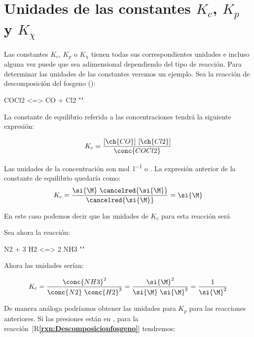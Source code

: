     \section{Unidades de las constantes \texorpdfstring{\(K_c\)}{Kc}, \texorpdfstring{\(K_p\)}{Kp} y  \texorpdfstring{\(K_{\chi}\)}{Kx}}

    Las constantes {\(K_c\)}, {\(K_p\)} o {\(K_{\chi}\)} tienen todas sus correspondientes unidades e incluso alguna vez puede que sea adimensional dependiendo del tipo de reacción.
    Para determinar las unidades de las constantes veremos un ejemplo.
    Sea la reacción de descomposición del fosgeno ():

    \begin{reaction}
        COCl2 \gas{} <=> CO \gas{} + Cl2 \gas{}
        "\label{rxn:Descomposicionfosgeno}"
    \end{reaction}

    La constante de equilibrio referida a las concentraciones tendrá la siguiente expresión:

    \begin{equation*}
        K_c = \dfrac{[\ch{CO}]\ [\ch{Cl2}]}{\conc{COCl2}}
    \end{equation*}

    Las unidades de la concentración son \si{\mole\per\litre} o \si{\M}.
    La expresión anterior de la constante de equilibrio quedaría como:
    \begin{equation*}
        K_c = \dfrac{\si{\M}\ \cancelred{\si{\M}}}{\cancelred{\si{\M}}} = \si{\M}
    \end{equation*}

    En este caso podemos decir que las unidades de \( K_c \) para esta reacción será \si{\M}

    Sea ahora la reacción:

    \begin{reaction}
        N2 \gas{} + 3 H2 \gas{} <=> 2 NH3 \gas{}
        "\label{rxn:descomposicionamoniaco}"
    \end{reaction}

    Ahora las unidades serían:

    \begin{equation*}
        K_c = \dfrac{\conc{NH3}^2}{\conc{N2}\ \conc{H2}^3} = \dfrac{\si{\M}^2}{\si{\M}\ \si{\M}^3 } = \dfrac{1}{\si{\M}^2}
    \end{equation*}

    De manera análoga podríamos obtener las unidades para \( K_p \) para las reacciones anteriores.
    Si las presiones están en \si{\atmosphere}, para la reacción~[R\textcolor{blue}{\textbf{\ref{rxn:Descomposicionfosgeno}}}] tendremos:


